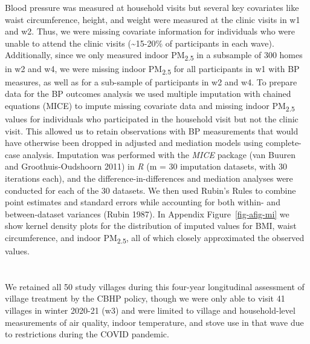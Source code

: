 \documentclass[
  letterpaper,
  DIV=11,
  numbers=noendperiod]{scrartcl}
\providecommand{\DIFadd}[1]{{\protect\color{blue}\uwave{#1}}} %
\providecommand{\DIFaddbegin}{} %
\providecommand{\DIFaddend}{} %
\providecommand{\DIFdelbegin}{} %
\providecommand{\DIFdelend}{} %
\newcommand{\DIFscaledelfig}{0.5}
\newlength{\DIFdelgraphicswidth} %
\newlength{\DIFdelgraphicsheight} %
\newcommand{\DIFaddincludegraphics}[2][]{{\color{blue}\fbox{\DIFOincludegraphics[#1]{#2}}}} %
\newcommand{\DIFdelincludegraphics}[2][]{%
\sbox{\DIFdelgraphicsbox}{\DIFOincludegraphics[#1]{#2}}%
\settoboxwidth{\DIFdelgraphicswidth}{\DIFdelgraphicsbox} %
\settoboxtotalheight{\DIFdelgraphicsheight}{\DIFdelgraphicsbox} %
\scalebox{\DIFscaledelfig}{%
\parbox[b]{\DIFdelgraphicswidth}{\usebox{\DIFdelgraphicsbox}\\[-\baselineskip] \rule{\DIFdelgraphicswidth}{0em}}\llap{\resizebox{\DIFdelgraphicswidth}{\DIFdelgraphicsheight}{%
\setlength{\unitlength}{\DIFdelgraphicswidth}%
\begin{picture}(1,1)%
\thicklines\linethickness{2pt} %
{\color[rgb]{1,0,0}\put(0,0){\framebox(1,1){}}}%
{\color[rgb]{1,0,0}\put(0,0){\line( 1,1){1}}}%
{\color[rgb]{1,0,0}\put(0,1){\line(1,-1){1}}}%
\end{picture}%
}\hspace*{3pt}}} %
} %
\DeclareRobustCommand{\DIFaddbegin}{\DIFOaddbegin \let\includegraphics\DIFaddincludegraphics} %
\DeclareRobustCommand{\DIFaddend}{\DIFOaddend \let\includegraphics\DIFOincludegraphics} %
\DeclareRobustCommand{\DIFdelbegin}{\DIFOdelbegin \let\includegraphics\DIFdelincludegraphics} %
\DeclareRobustCommand{\DIFdelend}{\DIFOaddend \let\includegraphics\DIFOincludegraphics} %
\begin{document}
Blood pressure was measured at household visits but several key
covariates like waist circumference, height, and weight were measured at
the clinic visits in w1 and w2. Thus, we were missing covariate
information for individuals who were unable to attend the clinic visits
(\textasciitilde15-20\% of participants in each wave). Additionally,
since we only measured indoor PM\textsubscript{2.5} in a subsample of
300 homes in w2 and w4, we were missing indoor PM\textsubscript{2.5} for
all participants in w1 with BP measures, as well as for a sub-sample of
participants in w2 and w4. To prepare data for the BP outcomes analysis
we used multiple imputation with chained equations (MICE) to impute
missing covariate data and missing indoor PM\textsubscript{2.5} values
for individuals who participated in the household visit but not the
clinic visit. This allowed us to retain observations with BP
measurements that would have otherwise been dropped in adjusted and
mediation models using complete-case analysis. Imputation was performed
with the \emph{MICE} package (van Buuren and Groothuis-Oudshoorn 2011)
in \emph{R} (m = 30 imputation datasets, with 30 iterations each), and
the difference-in-differences and mediation analyses were conducted for
each of the 30 datasets. We then used Rubin's Rules to combine point
estimates and standard errors while accounting for both within- and
between-dataset variances (Rubin 1987). In Appendix
Figure~\ref{fig-afig-mi} we show kernel density plots for the
distribution of imputed values for BMI, waist circumference, and indoor
PM\textsubscript{2.5}, all of which closely approximated the observed
values.

\DIFdelbegin %
\DIFdelend \DIFaddbegin \section{\DIFadd{Results}}\label{results-1}
\DIFaddend 

We retained all 50 study villages during this four-year longitudinal
assessment of village treatment by the CBHP policy, though we were only
able to visit 41 villages in winter 2020-21 (w3) and were limited to
village and household-level measurements of air quality, indoor
temperature, and stove use in that wave due to restrictions during the
COVID pandemic.
\end{document}
